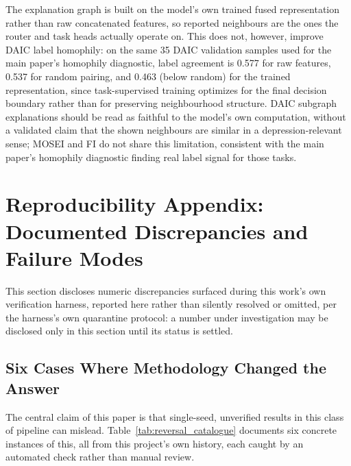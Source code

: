 \documentclass[letterpaper]{article}
\begin{document}
The explanation graph is built on the model's own trained fused representation rather than raw concatenated features, so reported neighbours are the ones the router and task heads actually operate on. This does not, however, improve DAIC label homophily: on the same 35 DAIC validation samples used for the main paper's homophily diagnostic, label agreement is 0.577 for raw features, 0.537 for random pairing, and 0.463 (below random) for the trained representation, since task-supervised training optimizes for the final decision boundary rather than for preserving neighbourhood structure. DAIC subgraph explanations should be read as faithful to the model's own computation, without a validated claim that the shown neighbours are similar in a depression-relevant sense; MOSEI and FI do not share this limitation, consistent with the main paper's homophily diagnostic finding real label signal for those tasks.

\section{Reproducibility Appendix: Documented Discrepancies and Failure Modes}
\label{sec:repro_appendix}

This section discloses numeric discrepancies surfaced during this work's own verification harness, reported here rather than silently resolved or omitted, per the harness's own quarantine protocol: a number under investigation may be disclosed only in this section until its status is settled.

\subsection{Six Cases Where Methodology Changed the Answer}
\label{sec:repro-catalogue}

The central claim of this paper is that single-seed, unverified results in this class of pipeline can mislead. Table~\ref{tab:reversal_catalogue} documents six concrete instances of this, all from this project's own history, each caught by an automated check rather than manual review.
\end{document}
